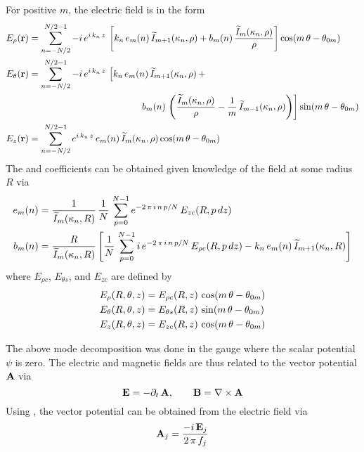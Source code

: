 For positive $m$, the electric field is in the form
\begin{align}
  E_\rho({\bf r}) &= \sum_{n=-N/2}^{N/2-1}
    -i \, e^{i \, k_n \, z} \, 
    \left[ 
    k_n \, e_m(n) \, \widetilde I_{m+1}(\kappa_n, \rho) +
    b_m(n) \, \frac{\widetilde I_m(\kappa_n, \rho)}{\rho}
    \right]
    \cos(m \, \theta - \theta_{0m}) \nonumber \\
  E_\theta({\bf r}) &= \sum_{n=-N/2}^{N/2-1} 
    -i \, e^{i \, k_n \, z} \, 
    \left[
    k_n \, e_m(n) \, \widetilde I_{m+1}(\kappa_n, \rho) \, + \right. \\
  & \left. \qquad \qquad \qquad \qquad \qquad \qquad
    b_m(n) \, \left( \frac{\widetilde I_m(\kappa_n, \rho)}{\rho} - 
    \frac{1}{m} \, \widetilde I_{m-1}(\kappa_n, \rho) \right)
    \right] 
    \sin(m \, \theta - \theta_{0m}) \nonumber \\
  E_z({\bf r}) &= \sum_{n=-N/2}^{N/2-1}e^{i \, k_n \, z} \, 
    e_m(n) \, \widetilde I_m(\kappa_n, \rho) \cos(m \, \theta - \theta_{0m}) \nonumber
\end{align}
The  and  coefficients can be obtained given knowledge of the field at some radius $R$ via
\begin{align}
  e_m(n) &= \frac{1}{\widetilde I_m(\kappa_n, R)} \, \frac{1}{N} \, \sum_{p=0}^{N-1}
    e^{-2 \, \pi \, i \, n \, p / N} \, E_{zc}(R, p \, dz) \nonumber \\
  b_m(n) &= \frac{R}{\widetilde I_m(\kappa_n, R)} \left[
    \frac{1}{N} \, \sum_{p=0}^{N-1}
    i \, e^{-2 \, \pi \, i \, n \, p / N} \, E_{\rho c}(R, p \, dz) -
    k_n \, e_m(n) \, \widetilde I_{m+1}(\kappa_n, R)
    \right]
\end{align}
where $E_{\rho c}$, $E_{\theta s}$, and $E_{z c}$ are defined by
\begin{align}
  E_\rho(R, \theta, z) &= E_{\rho c}(R, z) \, \cos(m \, \theta - \theta_{0m}) \nonumber \\
  E_\theta(R, \theta, z) &= E_{\theta s}(R, z) \, \sin(m \, \theta - \theta_{0m}) \\
  \label{erpze}
  E_z(R, \theta, z)    &= E_{z c}(R, z)    \, \cos(m \, \theta - \theta_{0m}) \nonumber
\end{align}

The above mode decomposition was done in the gauge where the scalar potential $\psi$ is zero. The
electric and magnetic fields are thus related to the vector potential ${\bf A}$ via
\begin{equation}
  {\bf E} = -\partial_t \, {\bf A}, \qquad {\bf B} = \nabla \times {\bf A}
\end{equation}
Using , the vector potential can be obtained from the electric field via
\begin{equation}
  {\bf A}_j = \frac{-i \, {\bf E}_j}{2 \, \pi \, f_j}
  \label{aiew}
\end{equation}
 
